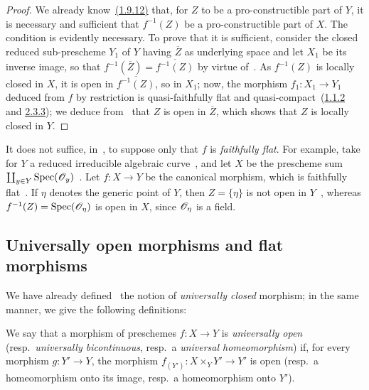 \begin{proof}
We already know~{\hyperref[IV.1.9.12]{(1.9.12)}} that, for $Z$ to be a pro-constructible part of $Y$, it is necessary and sufficient that $f^{-1}(Z)$ be a pro-constructible part of $X$.
The condition is evidently necessary.
To prove that it is sufficient, consider the closed reduced sub-prescheme $Y_1$ of $Y$ having $\overline{Z}$ as underlying space and let $X_1$ be its inverse image, so that $f^{-1}(\overline{Z})=\overline{f^{-1}(Z)}$ by virtue of~.
As $f^{-1}(Z)$ is locally closed in $X$, it is open in $\overline{f^{-1}(Z)}$, so in $X_1$; now, the morphism $f_1:X_1\to Y_1$ deduced from $f$ by restriction is quasi-faithfully flat and quasi-compact~({\hyperref[IV.1.1.2]{1.1.2}} and {\hyperref[IV.2.3.3]{2.3.3}}); we deduce from~ that $Z$ is open in $\overline{Z}$, which shows that $Z$ is locally closed in $Y$.
\end{proof}

\begin{remark}[2.3.15]
\label{IV.2.3.15}
It does not suffice, in~, to suppose only that $f$ is \emph{faithfully flat}.
For example, take for $Y$ a reduced irreducible algebraic curve~, and let
$X$ be the prescheme sum $\coprod_{y\in Y}\operatorname{Spec}(\mathscr{O}_y)$~.
Let $f:X\to Y$ be the canonical morphism, which is faithfully flat~.
If $\eta$ denotes the generic point of $Y$, then $Z=\{\eta\}$ is not open in $Y$~, whereas $f^{-1}(Z)=\operatorname{Spec}(\mathscr{O}_\eta)$ is open in $X$, since $\mathscr{O}_\eta$ is a field.
\end{remark}

\subsection{Universally open morphisms and flat morphisms}
\label{subsection:IV.2.4}

\begin{env}[2.4.1]
\label{IV.2.4.1}
We have already defined~ the notion of \emph{universally closed} morphism; in the same manner, we give the following definitions:
\end{env}

\begin{definition}[2.4.2]
\label{IV.2.4.2}
We say that a morphism of preschemes $f:X\to Y$ is \emph{universally open} \textnormal{(}resp.\ \emph{universally bicontinuous}, resp.\ a \emph{universal homeomorphism}\textnormal{)} if, for every morphism $g:Y'\to Y$, the morphism $f_{(Y')}:X\times_Y Y'\to Y'$ is open \textnormal{(}resp.\ a homeomorphism onto its image, resp.\ a homeomorphism onto $Y'$\textnormal{)}.
\end{definition}

